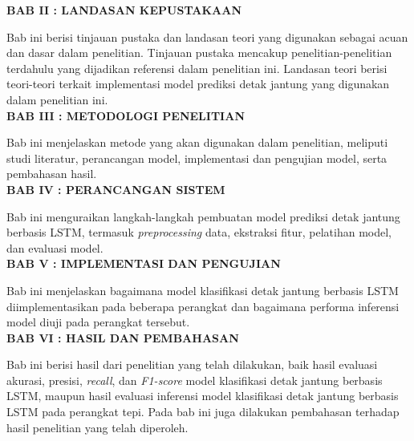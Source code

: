 \noindent
\textbf{BAB II : LANDASAN KEPUSTAKAAN}

Bab ini berisi tinjauan pustaka dan landasan teori yang digunakan sebagai acuan dan dasar dalam penelitian. Tinjauan pustaka mencakup penelitian-penelitian terdahulu yang dijadikan referensi dalam penelitian ini. Landasan teori berisi teori-teori terkait implementasi model prediksi detak jantung yang digunakan dalam penelitian ini.\\

\noindent
\textbf{BAB III : METODOLOGI PENELITIAN}

Bab ini menjelaskan metode yang akan digunakan dalam penelitian, meliputi studi literatur, perancangan model, implementasi dan pengujian model, serta pembahasan hasil.\\

\noindent
\textbf{BAB IV : PERANCANGAN SISTEM}

Bab ini menguraikan langkah-langkah pembuatan model prediksi detak jantung berbasis LSTM, termasuk \textit{preprocessing} data, ekstraksi fitur, pelatihan model, dan evaluasi model.\\

\noindent
\textbf{BAB V : IMPLEMENTASI DAN PENGUJIAN}

Bab ini menjelaskan bagaimana model klasifikasi detak jantung berbasis LSTM diimplementasikan pada beberapa perangkat dan bagaimana performa inferensi model diuji pada perangkat tersebut.\\

\noindent
\textbf{BAB VI : HASIL DAN PEMBAHASAN}

Bab ini berisi hasil dari penelitian yang telah dilakukan, baik hasil evaluasi akurasi, presisi, \emph{recall}, dan \emph{F1-score} model klasifikasi detak jantung berbasis LSTM, maupun hasil evaluasi inferensi model klasifikasi detak jantung berbasis LSTM pada perangkat tepi.
Pada bab ini juga dilakukan pembahasan terhadap hasil penelitian yang telah diperoleh.\\

